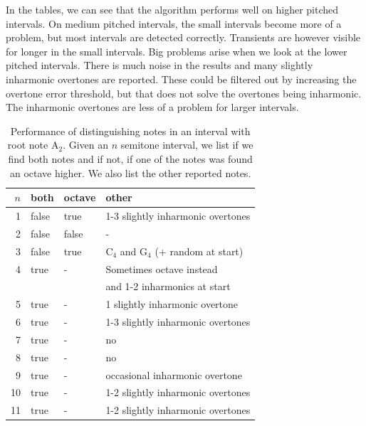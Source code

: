 \documentclass[10pt,twocolumn]{article}
\begin{document}
In the tables, we can see that the algorithm performs well on higher pitched intervals. On medium pitched intervals, the small intervals become more of a problem, but most intervals are detected correctly. Transients are however visible for longer in the small intervals. Big problems arise when we look at the lower pitched intervals. There is much noise in the results and many slightly inharmonic overtones are reported. These could be filtered out by increasing the overtone error threshold, but that does not solve the overtones being inharmonic. The inharmonic overtones are less of a problem for larger intervals.
%
%
\begin{table}[H]%
    \centering
    \begin{tabular}{r|lll}
        $n$ & both & octave & other \\
        \hline
        1  & false & true & 1-3 slightly inharmonic overtones \\
        2  & false & false & - \\
        3  & false & true & $\text{C}_4$ and $\text{G}_4$ (+ random at start) \\
        4  & true & - & Sometimes octave instead\\ &&& and 1-2 inharmonics at start \\
        5  & true & - & 1 slightly inharmonic overtone \\
        6  & true & - & 1-3 slightly inharmonic overtones \\
        7  & true & - & no \\
        8  & true & - & no \\
        9  & true & - & occasional inharmonic overtone \\
        10 & true & - & 1-2 slightly inharmonic overtones \\
        11 & true & - & 1-2 slightly inharmonic overtones
    \end{tabular}
    \caption{Performance of distinguishing notes in an interval with root note $\text{A}_2$. Given an $n$ semitone interval, we list if we find both notes and if not, if one of the notes was found an octave higher. We also list the other reported notes.}
    \label{tab:polperf1}
\end{table}
\end{document}
